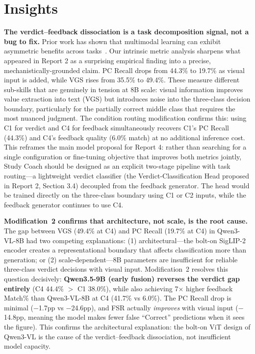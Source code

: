 \documentclass{article}
\begin{document}
\clearpage

\section{ Insights}

\textbf{The verdict--feedback dissociation is a task decomposition signal, not a
bug to fix.} Prior work has shown that multimodal learning can exhibit asymmetric
benefits across tasks~\cite{wang2020makes}. Our intrinsic metric analysis sharpens what appeared in Report 2 as a
surprising empirical finding into a precise, mechanistically-grounded claim. PC
Recall drops from 44.3\% to 19.7\% as visual input is added, while VGS rises from
35.5\% to 49.4\%. These measure different sub-skills that are genuinely in tension
at 8B scale: visual information improves value extraction into text (VGS) but
introduces noise into the three-class decision boundary, particularly for the
partially correct middle class that requires the most nuanced judgment. The
condition routing modification confirms this: using C1 for verdict and C4 for
feedback simultaneously recovers C1's PC Recall (44.3\%) and C4's feedback quality
(6.0\% match) at no additional inference cost. This reframes the main model
proposal for Report 4: rather than searching for a single configuration or fine-tuning
objective that improves both metrics jointly, Study Coach should be designed as an
explicit two-stage pipeline with task routing---a lightweight verdict classifier
(the Verdict-Classification Head proposed in Report 2, Section 3.4) decoupled from the
feedback generator. The head would be trained directly on the three-class boundary
using C1 or C2 inputs, while the feedback generator continues to use C4.

\textbf{Modification~2 confirms that architecture, not scale, is the root cause.}
The gap between VGS (49.4\% at C4) and PC Recall (19.7\% at C4) in Qwen3-VL-8B had two
competing explanations: (1) architectural---the bolt-on SigLIP-2 encoder creates a
representational boundary that affects classification more than generation; or
(2) scale-dependent---8B parameters are insufficient for reliable three-class
verdict decisions with visual input. Modification~2 resolves this question
decisively: \textbf{Qwen3.5-9B (early fusion) reverses the verdict gap entirely}
(C4 44.4\% $>$ C1 38.0\%), while also achieving 7$\times$ higher feedback Match\%
than Qwen3-VL-8B at C4 (41.7\% vs 6.0\%). The PC Recall drop is minimal ($-$1.7pp
vs $-$24.6pp), and FSR actually \emph{improves} with visual input ($-$14.8pp,
meaning the model makes fewer false ``Correct'' predictions when it sees the figure).
This confirms the architectural explanation: the bolt-on ViT design of Qwen3-VL
is the cause of the verdict--feedback dissociation, not insufficient model capacity.
\end{document}
